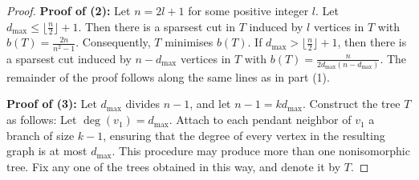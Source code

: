 \documentclass[12pt]{article}
\begin{document}
\begin{proof}


\noindent\textbf{Proof of (2): } Let $n=2l+1$ for some positive integer $l$.
 Let $d_{\max} \leq \lfloor \frac{n}{2} \rfloor +1$. Then there is a sparsest cut in $T$ induced by $l$ vertices in $T$ with $b(T)=\frac{2n}{n^2-1}$. Consequently, $T$ minimises $b(T)$. If $d_{\max} > \lfloor \frac{n}{2} \rfloor +1$, then there is a sparsest cut induced by $n-d_{\max}$ vertices in $T$ with $b(T)=\frac{n}{2d_{\max}(n-d_{\max})}$. The remainder of the proof follows along the same lines as in part (1).





\noindent\textbf{Proof of (3):} Let $d_{\max}$ divides $n-1$, and let $n-1 = k d_{\max}$. Construct the tree $T$ as follows: Let $\deg(v_1)=d_{\max}$. Attach to each pendant neighbor of $v_1$ a branch of size $k-1$, ensuring that the degree of every vertex in the resulting graph is at most $d_{\max}$. This procedure may produce more than one nonisomorphic tree. Fix any one of the trees obtained in this way, and denote it by $T$. 
 

\end{proof}
\end{document}
